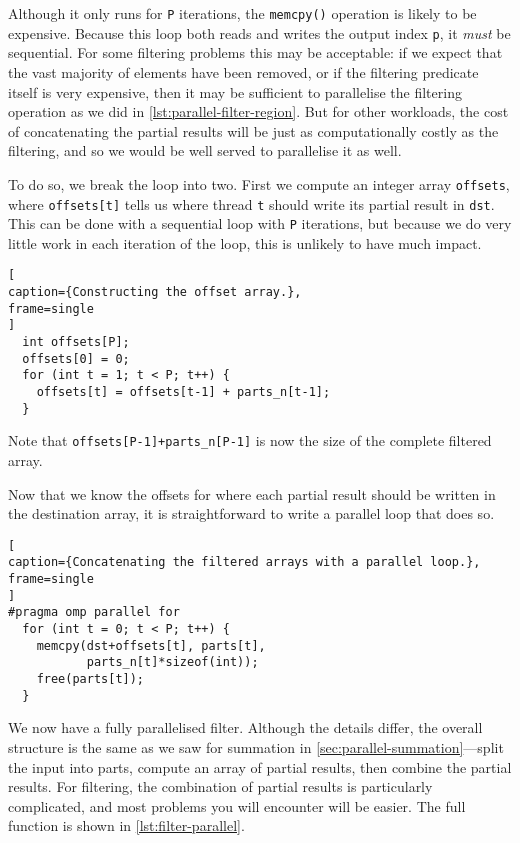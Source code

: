 Although it only runs for \texttt{P} iterations, the \texttt{memcpy()}
operation is likely to be expensive. Because this loop both reads and
writes the output index \texttt{p}, it \emph{must} be sequential. For
some filtering problems this may be acceptable: if we expect that the
vast majority of elements have been removed, or if the filtering
predicate itself is very expensive, then it may be sufficient to
parallelise the filtering operation as we did in
\cref{lst:parallel-filter-region}. But for other workloads, the cost
of concatenating the partial results will be just as computationally
costly as the filtering, and so we would be well served to parallelise
it as well.

To do so, we break the loop into two. First we compute an integer
array \texttt{offsets}, where \texttt{offsets[t]} tells us where
thread \texttt{t} should write its partial result in \texttt{dst}.
This can be done with a sequential loop with \texttt{P} iterations,
but because we do very little work in each iteration of the loop, this
is unlikely to have much impact.

\begin{minipage}{\linewidth}
\begin{lstlisting}[
caption={Constructing the offset array.},
frame=single
]
  int offsets[P];
  offsets[0] = 0;
  for (int t = 1; t < P; t++) {
    offsets[t] = offsets[t-1] + parts_n[t-1];
  }
\end{lstlisting}
\end{minipage}

Note that \lstinline{offsets[P-1]+parts_n[P-1]} is now the size of the
complete filtered array.

Now that we know the offsets for where each partial result should be
written in the destination array, it is straightforward to write a
parallel loop that does so.

\begin{lstlisting}[
caption={Concatenating the filtered arrays with a parallel loop.},
frame=single
]
#pragma omp parallel for
  for (int t = 0; t < P; t++) {
    memcpy(dst+offsets[t], parts[t],
           parts_n[t]*sizeof(int));
    free(parts[t]);
  }
\end{lstlisting}

We now have a fully parallelised filter. Although the details differ,
the overall structure is the same as we saw for summation in
\cref{sec:parallel-summation}---split the input into parts, compute an
array of partial results, then combine the partial results. For
filtering, the combination of partial results is particularly
complicated, and most problems you will encounter will be easier. The
full function is shown in \cref{lst:filter-parallel}.

